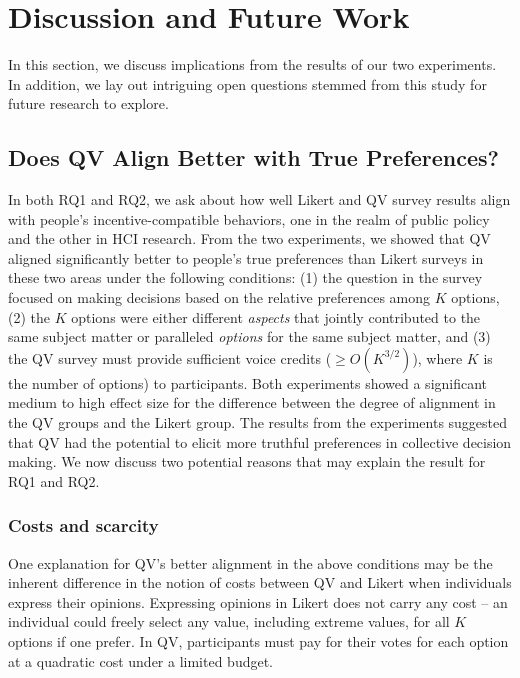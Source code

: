 \section{Discussion and Future Work} \label{discussion}
In this section, we discuss implications from the results of our two experiments. In addition, we lay out intriguing open questions stemmed from this study for future research to explore.

\subsection{Does QV Align Better with True Preferences?}
In both RQ1 and RQ2, we ask about how well Likert and QV survey results align with people's incentive-compatible behaviors, one in the realm of public policy and the other in HCI research. From the two experiments, we showed that QV aligned significantly better to people's true preferences than Likert surveys in these two areas under the following conditions: (1) the question in the survey focused on making decisions based on the relative preferences among $K$ options, (2) the $K$ options were either different \textit{aspects} that jointly contributed to the same subject matter or paralleled \textit{options} for the same subject matter, and (3) the QV survey must provide sufficient voice credits ($\geq O(K^{3/2})$), where $K$ is the number of options) to participants. Both experiments showed a significant medium to high effect size for the difference between the degree of alignment in the QV groups and the Likert group. The results from the experiments suggested that QV had the potential to elicit more truthful preferences in collective decision making. We now discuss two potential reasons that may explain the result for RQ1 and RQ2.

\subsubsection{Costs and scarcity}
One explanation for QV's better alignment in the above conditions may be the inherent difference in the notion of costs between QV and Likert when individuals express their opinions. Expressing opinions in Likert does not carry any cost -- an individual could freely select any value, including extreme values, for all $K$ options if one prefer. In QV, participants must pay for their votes for each option at a quadratic cost under a limited budget. 

